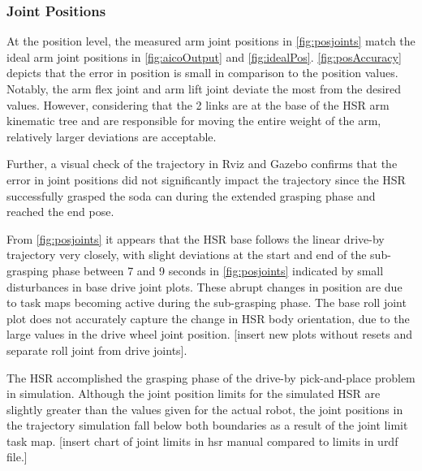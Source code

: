 \documentclass[12pt]{article}
\begin{document}
        \subsubsection{Joint Positions} 
            At the position level, the measured arm joint positions in \cref{fig:posjoints} match the ideal arm joint positions in \cref{fig:aicoOutput} and \cref{fig:idealPos}. \cref{fig:posAccuracy} depicts that the error in position is small in comparison to the position values. Notably, the arm flex joint and arm lift joint deviate the most from the desired values. However, considering that the 2 links are at the base of the HSR arm kinematic tree and are responsible for moving the entire weight of the arm, relatively larger deviations are acceptable.
            \par Further, a visual check of the trajectory in Rviz and Gazebo confirms that the error in joint positions did not significantly impact the trajectory since the HSR successfully grasped the soda can during the extended grasping phase and reached the end pose. \par From \cref{fig:posjoints} it appears that the HSR base follows the linear drive-by trajectory very closely, with slight deviations at the start and end of the sub-grasping phase between 7 and 9 seconds in \cref{fig:posjoints} indicated by small disturbances in base drive joint plots. These abrupt changes in position are due to task maps becoming active during the sub-grasping phase. The base roll joint plot does not accurately capture the change in HSR body orientation, due to the large values in the drive wheel joint position. [insert new plots without resets and separate roll joint from drive joints].
            \par The HSR accomplished the grasping phase of the drive-by pick-and-place problem in simulation. Although the joint position limits for the simulated HSR are slightly greater than the values given for the actual robot, the joint positions in the trajectory simulation fall below both boundaries as a result of the joint limit task map. [insert chart of joint limits in hsr manual compared to limits in urdf file.]
\end{document}
